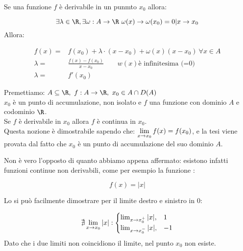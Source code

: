 \documentclass[../analisi.tex]{subfiles}
\begin{document}
\begin{defn}
	Se una funzione $f$ è derivabile in un punmto $x_0$ allora:

	\begin{equation}
		\exists \lambda \in \R, \exists \omega : A \to \R\
		\omega (x) \to \omega (x_0)  = 0 | \xtx
	\end{equation}
	Allora:

	\begin{equation}
		\begin{aligned}
		f(x) =& f(x_0) + \lambda \cdot ( x - x_0 ) + \omega (x) (x-x_0)\ 
		\forall x \in A\\
		\lambda = &\frac{f(x) - f(x_0)}{x - x_0} \qquad w(x) 
		\text{è infinitesima (=0)}\\
		\lambda = & f'( x_0 )
		\end{aligned}
	\end{equation}
\end{defn}


\begin{defn}
Premettiamo: $ \acr,\ f: A \to \R,\ x_0 \in A \cap D(A)$\\
$ x_0$ è un punto di accumulazione, non isolato e $f$ una funzione con dominio
$A$ e codominio $\R$.\\
Se $f$ è derivabile in $x_0$ allora $f$ è continua in $x_0$.\\
Questa nozione è dimostrabile sapendo che: $\lim \limits_{x \to x_0} f(x) = f(x_0) $, e la tesi 
viene provata dal fatto che $x_0$ è un punto di accumulazione del suo dominio $A$.
\end{defn}

\begin{esem}
Non è vero l'opposto di quanto abbiamo appena affermato: esistono infatti funzioni
continue non derivabili, come per esempio la funzione :

\begin{equation}
	f(x) = | x |
\end{equation}
\end{esem}

\begin{dimo}
	Lo si può facilmente dimostrare per il limite destro e sinistro in 0:

	\begin{equation}
		\nexists \lim \limits_{x \to x_0} | x | :
		\begin{cases}
			\lim_{x \to x_0^+} |x|, & 1\\
			\lim_{x \to x_0^-} |x|, & -1
		\end{cases}
	\end{equation}
	Dato che i due limiti non coincidiono il limite, nel punto $x_0$ non esiste.
\end{dimo}
\end{document}
